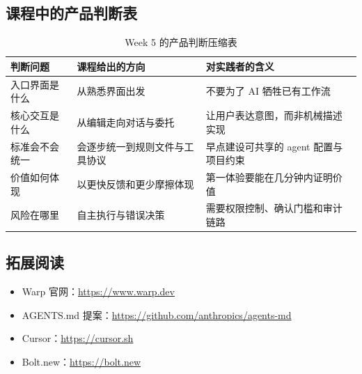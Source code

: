 \documentclass[a4paper]{article}
\begin{document}
\subsection{课程中的产品判断表}

\begin{table}[H]
\centering
\begin{tabular}{p{} p{} p{}}
\toprule
判断问题 & 课程给出的方向 & 对实践者的含义 \\
\midrule
入口界面是什么 & 从熟悉界面出发 & 不要为了 AI 牺牲已有工作流 \\
核心交互是什么 & 从编辑走向对话与委托 & 让用户表达意图，而非机械描述实现 \\
标准会不会统一 & 会逐步统一到规则文件与工具协议 & 早点建设可共享的 agent 配置与项目约束 \\
价值如何体现 & 以更快反馈和更少摩擦体现 & 第一体验要能在几分钟内证明价值 \\
风险在哪里 & 自主执行与错误决策 & 需要权限控制、确认门槛和审计链路 \\
\bottomrule
\end{tabular}
\caption{Week 5 的产品判断压缩表}
\end{table}

\subsection{拓展阅读}

\begin{itemize}
    \item Warp 官网：\url{https://www.warp.dev}
    \item AGENTS.md 提案：\url{https://github.com/anthropics/agents-md}
    \item Cursor：\url{https://cursor.sh}
    \item Bolt.new：\url{https://bolt.new}
\end{itemize}

\end{document}
